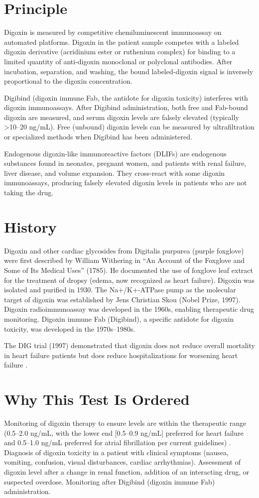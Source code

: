 \section*{Principle}
Digoxin is measured by competitive chemiluminescent immunoassay on automated platforms. Digoxin in the patient sample competes with a labeled digoxin derivative (acridinium ester or ruthenium complex) for binding to a limited quantity of anti-digoxin monoclonal or polyclonal antibodies. After incubation, separation, and washing, the bound labeled-digoxin signal is inversely proportional to the digoxin concentration.

Digibind (digoxin immune Fab, the antidote for digoxin toxicity) interferes with digoxin immunoassays. After Digibind administration, both free and Fab-bound digoxin are measured, and serum digoxin levels are falsely elevated (typically >10--20 ng/mL). Free (unbound) digoxin levels can be measured by ultrafiltration or specialized methods when Digibind has been administered.

Endogenous digoxin-like immunoreactive factors (DLIFs) are endogenous substances found in neonates, pregnant women, and patients with renal failure, liver disease, and volume expansion. They cross-react with some digoxin immunoassays, producing falsely elevated digoxin levels in patients who are not taking the drug.

\section*{History}
Digoxin and other cardiac glycosides from Digitalis purpurea (purple foxglove) were first described by William Withering in ``An Account of the Foxglove and Some of Its Medical Uses'' (1785). He documented the use of foxglove leaf extract for the treatment of dropsy (edema, now recognized as heart failure). Digoxin was isolated and purified in 1930. The Na+/K+-ATPase pump as the molecular target of digoxin was established by Jens Christian Skou (Nobel Prize, 1997). Digoxin radioimmunoassay was developed in the 1960s, enabling therapeutic drug monitoring. Digoxin immune Fab (Digibind), a specific antidote for digoxin toxicity, was developed in the 1970s--1980s.

The DIG trial (1997) demonstrated that digoxin does not reduce overall mortality in heart failure patients but does reduce hospitalizations for worsening heart failure \cite{dig1997effect}.

\section*{Why This Test Is Ordered}
Monitoring of digoxin therapy to ensure levels are within the therapeutic range (0.5--2.0 ng/mL, with the lower end [0.5--0.9 ng/mL] preferred for heart failure and 0.5--1.0 ng/mL preferred for atrial fibrillation per current guidelines) \cite{january2014aha}. Diagnosis of digoxin toxicity in a patient with clinical symptoms (nausea, vomiting, confusion, visual disturbances, cardiac arrhythmias). Assessment of digoxin level after a change in renal function, addition of an interacting drug, or suspected overdose. Monitoring after Digibind (digoxin immune Fab) administration.

